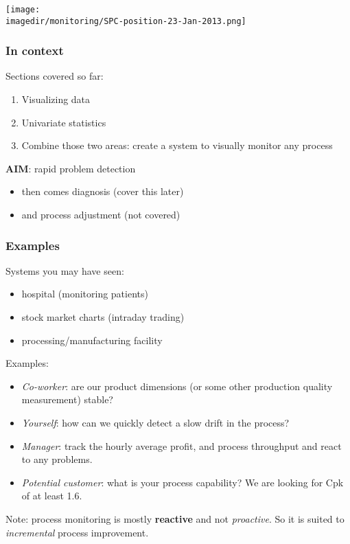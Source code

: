 \begin{frame}\frametitle{}
	\begin{center}
		\texttt{[image: \\imagedir/monitoring/SPC-position-23-Jan-2013.png]}
	\end{center}
\end{frame}

\begin{frame}\frametitle{In context}
	
	Sections covered so far: 
	\begin{enumerate}
		\item	Visualizing data 
		\item	Univariate statistics 
		\item	Combine those two areas: create a system to visually monitor any process 
	\end{enumerate}
	
	\textbf{AIM}: rapid problem detection
	\begin{itemize}
		\item	then comes diagnosis (cover this later) 
		\item	and process adjustment (not covered) 
	\end{itemize}
\end{frame}

\begin{frame}\frametitle{Examples}
	
	Systems you may have seen: 
	\begin{itemize}
		\item	hospital (monitoring patients) 
		\item	stock market charts (intraday trading) 
		\item	processing/manufacturing facility 
	\end{itemize}
	
	Examples: 
	\begin{itemize}
		\item	\emph{Co-worker}: are our product dimensions (or some other production quality measurement) stable? 
		\item	\emph{Yourself}: how can we quickly detect a slow drift in the process? 
		\item	\emph{Manager}: track the hourly average profit, and process throughput and react to any problems. 
		\item	\emph{Potential customer}: what is your process capability? We are looking for Cpk of at least 1.6. 
	\end{itemize}
	
	Note: process monitoring is mostly \textbf{reactive} and not \emph{proactive}. So it is suited to \emph{incremental} process improvement.
\end{frame}

